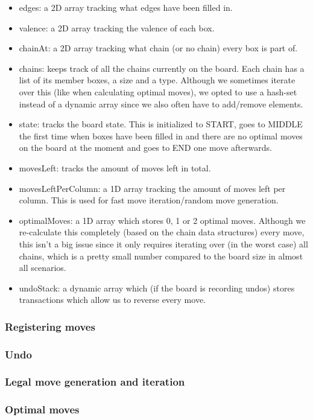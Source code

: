 \begin{itemize}
\item edges: a 2D array tracking what edges have been filled in.
\item valence: a 2D array tracking the valence of each box.
\item chainAt: a 2D array tracking what chain (or no chain) every box is part of.
\item chains: keeps track of all the chains currently on the board. Each chain has a list of its member boxes, a size and a type. Although we sometimes iterate over this (like when calculating optimal moves), we opted to use a hash-set instead of a dynamic array since we also often have to add/remove elements.
\item state: tracks the board state. This is initialized to START, goes to MIDDLE the first time when boxes have been filled in and there are no optimal moves on the board at the moment and goes to END one move afterwards.
\item movesLeft: tracks the amount of moves left in total.
\item movesLeftPerColumn: a 1D array tracking the amount of moves left per column. This is used for fast move iteration/random move generation.
\item optimalMoves: a 1D array which stores 0, 1 or 2 optimal moves. Although we re-calculate this completely (based on the chain data structures) every move, this isn't a big issue since it only requires iterating over (in the worst case) all chains, which is a pretty small number compared to the board size in almost all scenarios.
\item undoStack: a dynamic array which (if the board is recording undos) stores transactions which allow us to reverse every move.
\end{itemize}

\subsubsection{Registering moves}

\subsubsection{Undo}

\subsubsection{Legal move generation and iteration}

\subsubsection{Optimal moves}